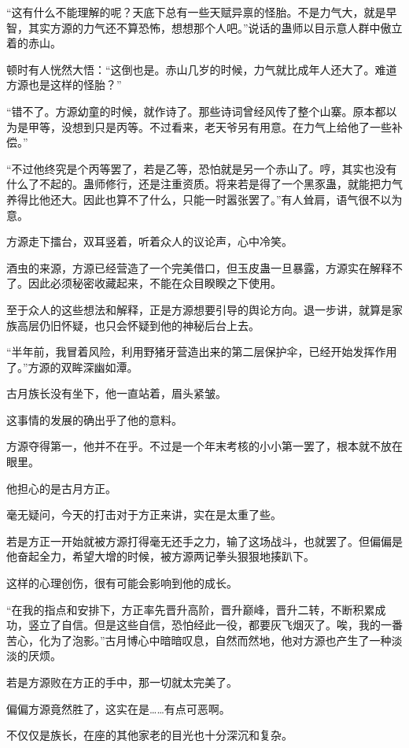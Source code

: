 \begin{this_body}
“这有什么不能理解的呢？天底下总有一些天赋异禀的怪胎。不是力气大，就是早智，其实方源的力气还不算恐怖，想想那个人吧。”说话的蛊师以目示意人群中傲立着的赤山。

顿时有人恍然大悟：“这倒也是。赤山几岁的时候，力气就比成年人还大了。难道方源也是这样的怪胎？”

“错不了。方源幼童的时候，就作诗了。那些诗词曾经风传了整个山寨。原本都以为是甲等，没想到只是丙等。不过看来，老天爷另有用意。在力气上给他了一些补偿。”

“不过他终究是个丙等罢了，若是乙等，恐怕就是另一个赤山了。哼，其实也没有什么了不起的。蛊师修行，还是注重资质。将来若是得了一个黑豕蛊，就能把力气养得比他还大。因此也算不了什么，只能一时嚣张罢了。”有人耸肩，语气很不以为意。

方源走下擂台，双耳竖着，听着众人的议论声，心中冷笑。

酒虫的来源，方源已经营造了一个完美借口，但玉皮蛊一旦暴露，方源实在解释不了。因此必须秘密收藏起来，不能在众目睽睽之下使用。

至于众人的这些想法和解释，正是方源想要引导的舆论方向。退一步讲，就算是家族高层仍旧怀疑，也只会怀疑到他的神秘后台上去。

“半年前，我冒着风险，利用野猪牙营造出来的第二层保护伞，已经开始发挥作用了。”方源的双眸深幽如潭。

古月族长没有坐下，他一直站着，眉头紧皱。

这事情的发展的确出乎了他的意料。

方源夺得第一，他并不在乎。不过是一个年末考核的小小第一罢了，根本就不放在眼里。

他担心的是古月方正。

毫无疑问，今天的打击对于方正来讲，实在是太重了些。

若是方正一开始就被方源打得毫无还手之力，输了这场战斗，也就罢了。但偏偏是他奋起全力，希望大增的时候，被方源两记拳头狠狠地揍趴下。

这样的心理创伤，很有可能会影响到他的成长。

“在我的指点和安排下，方正率先晋升高阶，晋升巅峰，晋升二转，不断积累成功，竖立了自信。但是这些自信，恐怕经此一役，都要灰飞烟灭了。唉，我的一番苦心，化为了泡影。”古月博心中暗暗叹息，自然而然地，他对方源也产生了一种淡淡的厌烦。

若是方源败在方正的手中，那一切就太完美了。

偏偏方源竟然胜了，这实在是……有点可恶啊。

不仅仅是族长，在座的其他家老的目光也十分深沉和复杂。


\end{this_body}
